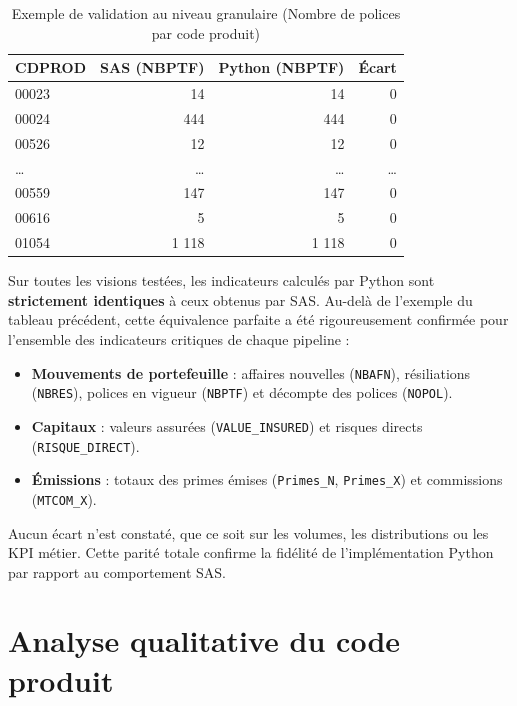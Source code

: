\begin{table}[H]
    \centering
    \caption{Exemple de validation au niveau granulaire (Nombre de polices par code produit)}
    \label{tab:kpi_micro}
    \begin{tabularx}{0.8\textwidth}{|X|r|r|r|}
        \hline
        \textbf{CDPROD} & \textbf{SAS (NBPTF)} & \textbf{Python (NBPTF)} & \textbf{Écart} \\
        \hline
        00023 & 14 & 14 & 0 \\
        \hline
        00024 & 444 & 444 & 0 \\
        \hline
        00526 & 12 & 12 & 0 \\
        \hline
        \dots & \dots & \dots & \dots \\
        \hline
        00559 & 147 & 147 & 0 \\
        \hline
        00616 & 5 & 5 & 0 \\
        \hline
        01054 & 1 118 & 1 118 & 0 \\
        \hline
    \end{tabularx}
\end{table}

Sur toutes les visions testées, les indicateurs calculés par Python sont
\textbf{strictement identiques} à ceux obtenus par SAS. Au-delà de l'exemple du tableau précédent, cette équivalence parfaite a été rigoureusement confirmée pour l'ensemble des indicateurs critiques de chaque pipeline :
\begin{itemize}
    \item \textbf{Mouvements de portefeuille} : affaires nouvelles (\texttt{NBAFN}), résiliations (\texttt{NBRES}), polices en vigueur (\texttt{NBPTF}) et décompte des polices (\texttt{NOPOL}).
    \item \textbf{Capitaux} : valeurs assurées (\texttt{VALUE\_INSURED}) et risques directs (\texttt{RISQUE\_DIRECT}).
    \item \textbf{Émissions} : totaux des primes émises (\texttt{Primes\_N}, \texttt{Primes\_X}) et commissions (\texttt{MTCOM\_X}).
\end{itemize}

Aucun écart n’est constaté, que ce soit sur les volumes, les distributions ou les KPI métier. Cette parité totale confirme la fidélité de l’implémentation Python par rapport au comportement SAS.

\section{Analyse qualitative du code produit}


